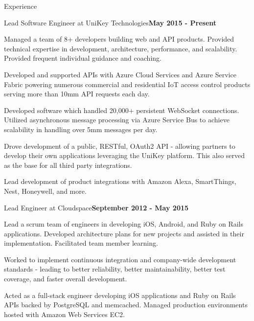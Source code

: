 \documentclass{resume} %
\begin{document}
\begin{rSection}{Experience}


\begin{rSubsection}{Lead Software Engineer at UniKey Technologies}{\bf May 2015 - Present}{}{}

\item Managed a team of 8+ developers building web and API products.  Provided technical expertise in development, architecture,  performance, and scalability.  Provided frequent individual guidance and coaching.
\item Developed and supported APIs with Azure Cloud Services and Azure Service Fabric powering numerous commercial and residential IoT access control products serving more than 10mm API requests each day.
\item Developed software which handled 20,000+ persistent WebSocket connections. Utilized asynchronous message processing via Azure Service Bus to achieve scalability in handling over 5mm messages per day.
\item Drove development of a public, RESTful, OAuth2 API - allowing partners to develop their own applications leveraging the UniKey platform.  This also served as the base for all third party integrations.
\item Lead development of product integrations with Amazon Alexa, SmartThings, Nest, Honeywell, and more.

\end{rSubsection}


\begin{rSubsection}{Lead Engineer at Cloudspace}{\bf September 2012 - May 2015}{}{}

\item Lead a scrum team of engineers in developing iOS, Android, and Ruby on Rails applications.  Developed architecture plans for new projects and assisted in their implementation. Facilitated team member learning.
\item Worked to implement continuous integration and company-wide development standards - leading to better reliability, better maintainability, better test coverage, and faster overall development.
\item Acted as a full-stack engineer developing iOS applications and Ruby on Rails APIs backed by PostgreSQL and memcached. Managed production environments hosted with Amazon Web Services EC2.


\end{rSubsection}
\end{rSection}
\end{document}
